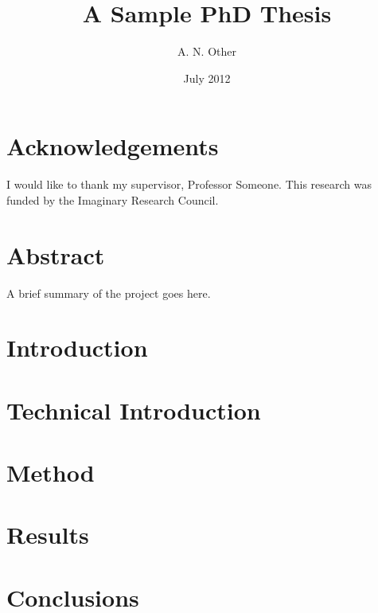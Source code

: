 \documentclass[oneside]{scrbook}
\title{A Sample PhD Thesis}
\author{A. N. Other}
\date{July 2012}
\begin{document}
\maketitle

\frontmatter
\tableofcontents
\listoffigures
\listoftables

\chapter{Acknowledgements}

I would like to thank my supervisor, Professor Someone. This
research was funded by the Imaginary Research Council.

\chapter{Abstract}

A brief summary of the project goes here.

\mainmatter

\chapter{Introduction}
\label{ch:intro}

\lipsum

\chapter{Technical Introduction}
\label{ch:techintro}

\lipsum

\chapter{Method}
\label{ch:method}

\lipsum

\chapter{Results}
\label{ch:results}

\lipsum

\chapter{Conclusions}
\label{ch:conc}

\lipsum

\backmatter


\end{document}
